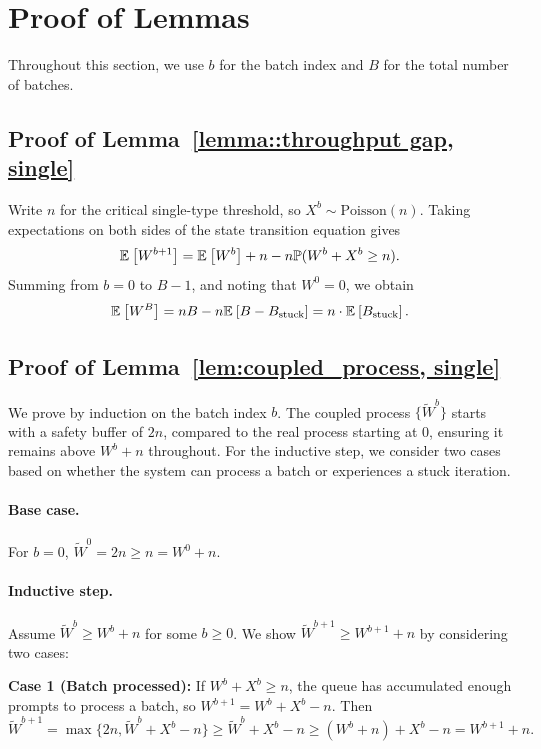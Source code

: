 \section{Proof of Lemmas}\label{sec:pf_lemmas}

Throughout this section, we use $b$ for the batch index and $B$ for the total number of batches.

\subsection{Proof of Lemma~\ref{lemma::throughput gap, single}}\label{appendix_lemma::proof of throughput gap, single}
Write \(n\) for the critical single-type threshold, so \(X^b\sim\mathrm{Poisson}(n)\). Taking expectations on both sides of the state transition equation gives
$$\mathbb{E}_{}\left[W^{b+1}\right]=\mathbb{E}_{}\left[W^b\right]+n - n \mathbb{P}(W^b+X^b\geq n).$$
Summing from \(b=0\) to \(B-1\), and noting that \(W^0=0\), we obtain
$$\mathbb{E}_{}\left[W^B\right]=n B - n \mathbb{E}_{}\left[B-B_{\text{stuck}}\right]=n\cdot \mathbb{E}_{}\left[B_{\text{stuck}}\right].$$

\subsection{Proof of Lemma~\ref{lem:coupled_process, single}}\label{appendix_lemma::proof of coupled_process, single}
We prove by induction on the batch index \(b\). The coupled process \(\{\tilde{W}^b\}\) starts with a safety buffer of \(2n\), compared to the real process starting at 0, ensuring it remains above \(W^b+n\) throughout. For the inductive step, we consider two cases based on whether the system can process a batch or experiences a stuck iteration.

\paragraph{Base case.} For \(b=0\), \(\tilde{W}^0=2n\geq n=W^0+n\).

\paragraph{Inductive step.} Assume \(\tilde{W}^b \geq W^b+n\) for some \(b \geq 0\). We show \(\tilde{W}^{b+1} \geq W^{b+1}+n\) by considering two cases:

\textbf{Case 1 (Batch processed):} If \(W^b+X^b\geq n\), the queue has accumulated enough prompts to process a batch, so \(W^{b+1}=W^b+X^b-n\). Then
$$\tilde{W}^{b+1}=\max\{ 2n, \tilde{W}^b + X^b - n \}\geq \tilde{W}^b + X^b - n\geq( W^b+n )+ X^b - n=W^{b+1}+n.$$

